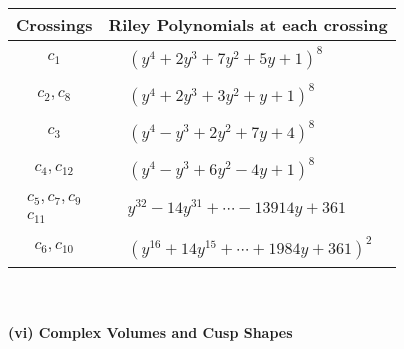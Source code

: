 \documentclass[1p]{elsarticle_modified}
\theoremstyle{definition}
\begin{document}
\begin{tabular}{m{50pt}|m{274pt}}
Crossings & \hspace{64pt}Riley Polynomials at each crossing \\
\hline $$\begin{aligned}c_{1}\end{aligned}$$&$\begin{aligned}
&(y^4+2 y^3+7 y^2+5 y+1)^8
\end{aligned}$\\
\hline $$\begin{aligned}c_{2},c_{8}\end{aligned}$$&$\begin{aligned}
&(y^4+2 y^3+3 y^2+y+1)^8
\end{aligned}$\\
\hline $$\begin{aligned}c_{3}\end{aligned}$$&$\begin{aligned}
&(y^4- y^3+2 y^2+7 y+4)^8
\end{aligned}$\\
\hline $$\begin{aligned}c_{4},c_{12}\end{aligned}$$&$\begin{aligned}
&(y^4- y^3+6 y^2-4 y+1)^8
\end{aligned}$\\
\hline $$\begin{aligned}c_{5},c_{7},c_{9}\\c_{11}\end{aligned}$$&$\begin{aligned}
&y^{32}-14 y^{31}+\cdots-13914 y+361
\end{aligned}$\\
\hline $$\begin{aligned}c_{6},c_{10}\end{aligned}$$&$\begin{aligned}
&(y^{16}+14 y^{15}+\cdots+1984 y+361)^{2}
\end{aligned}$\\
\hline
\end{tabular}\\~\\
\newpage\flushleft \textbf{(vi) Complex Volumes and Cusp Shapes}
\end{document}
